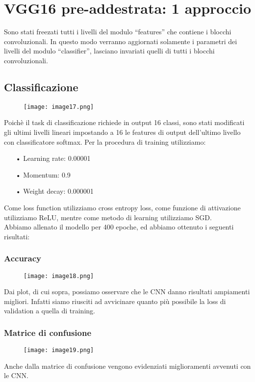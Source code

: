 \section{VGG16 pre-addestrata: {1\textdegree} approccio}
Sono stati freezati tutti i livelli del modulo “features” che contiene i blocchi convoluzionali. In questo modo verranno aggiornati solamente i parametri dei livelli del modulo “classifier”, lasciano invariati quelli di tutti i blocchi convoluzionali.

\subsection{Classificazione}
\begin{figure}[H]
	\centering
	\texttt{[image: image17.png]}
\end{figure}
Poichè il task di classificazione richiede in output 16 classi, sono stati modificati gli ultimi livelli lineari impostando a 16 le features di output dell’ultimo livello con classificatore softmax.
Per la procedura di training utilizziamo: 
\begin{itemize}
	\item[•]Learning rate: 0.00001
	\item[•]Momentum: 0.9
	\item[•]Weight decay: 0.000001
\end{itemize}
Come loss function utilizziamo cross entropy loss, come funzione di attivazione utilizziamo ReLU, mentre come metodo di learning utilizziamo SGD. \\
Abbiamo allenato il modello per 400 epoche, ed abbiamo ottenuto i seguenti risultati:

\subsubsection{Accuracy}
\begin{figure}[H]
	\centering
	\texttt{[image: image18.png]}
\end{figure}
Dai plot, di cui sopra, possiamo osservare che le CNN danno risultati ampiamenti migliori. Infatti siamo riusciti ad avvicinare quanto più possibile la loss di validation a quella di training. 

\subsubsection{Matrice di confusione}
\begin{figure}[H]
	\centering
	\texttt{[image: image19.png]}
\end{figure}
Anche dalla matrice di confusione vengono evidenziati miglioramenti avvenuti con le CNN.


